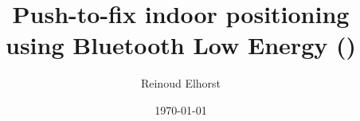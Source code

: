 \documentclass[a4paper, 12pt]{book}
\begin{document}
\title{Push-to-fix indoor positioning using Bluetooth Low Energy ()}
\author{Reinoud Elhorst}
\date{\today}
\maketitle









\end{document}
